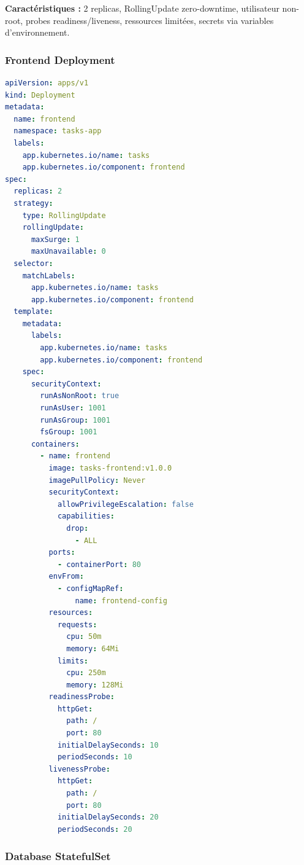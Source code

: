 \documentclass[12pt,a4paper]{report}
\begin{document}
\textbf{Caractéristiques :} 2 replicas, RollingUpdate zero-downtime, utilisateur non-root, probes readiness/liveness, ressources limitées, secrets via variables d'environnement.

\subsubsection{Frontend Deployment}

\begin{lstlisting}[language=yaml,caption=frontend-deployment.yaml]
apiVersion: apps/v1
kind: Deployment
metadata:
  name: frontend
  namespace: tasks-app
  labels:
    app.kubernetes.io/name: tasks
    app.kubernetes.io/component: frontend
spec:
  replicas: 2
  strategy:
    type: RollingUpdate
    rollingUpdate:
      maxSurge: 1
      maxUnavailable: 0
  selector:
    matchLabels:
      app.kubernetes.io/name: tasks
      app.kubernetes.io/component: frontend
  template:
    metadata:
      labels:
        app.kubernetes.io/name: tasks
        app.kubernetes.io/component: frontend
    spec:
      securityContext:
        runAsNonRoot: true
        runAsUser: 1001
        runAsGroup: 1001
        fsGroup: 1001
      containers:
        - name: frontend
          image: tasks-frontend:v1.0.0
          imagePullPolicy: Never
          securityContext:
            allowPrivilegeEscalation: false
            capabilities:
              drop:
                - ALL
          ports:
            - containerPort: 80
          envFrom:
            - configMapRef:
                name: frontend-config
          resources:
            requests:
              cpu: 50m
              memory: 64Mi
            limits:
              cpu: 250m
              memory: 128Mi
          readinessProbe:
            httpGet:
              path: /
              port: 80
            initialDelaySeconds: 10
            periodSeconds: 10
          livenessProbe:
            httpGet:
              path: /
              port: 80
            initialDelaySeconds: 20
            periodSeconds: 20
\end{lstlisting}

\subsubsection{Database StatefulSet}
\end{document}
